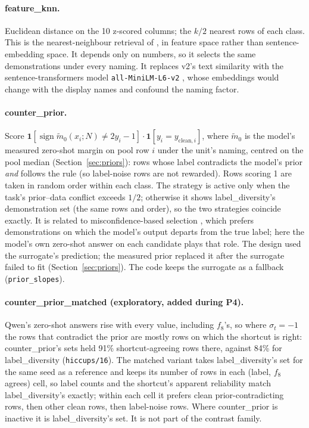 \documentclass[11pt,a4paper]{article}
\newcommand{\1}{\mathbf{1}}
\DeclareMathOperator{\sign}{sign}
\theoremstyle{plain}
\theoremstyle{definition}
\theoremstyle{remark}
\begin{document}
\paragraph{feature\_knn.} Euclidean distance on the 10 z-scored columns; the
$k/2$ nearest rows of each class. This is the nearest-neighbour retrieval of
\citet{liu2022what}, in feature space rather than sentence-embedding space. It depends only on numbers, so it selects
the same demonstrations under every naming. It replaces v2's text similarity
with the sentence-transformers model \texttt{all-MiniLM-L6-v2}
\citep{reimers2019sentence,wang2020minilm}, whose embeddings would change
with the display names and confound the naming factor.

\paragraph{counter\_prior.} Score
$\1[\sign \tilde m_0(x_i; N) \neq 2y_i - 1]\cdot\1[y_i = y_{\mathrm{clean},i}]$,
where $\tilde m_0$ is the model's measured zero-shot margin on pool row $i$
under the unit's naming, centred on the pool median
(Section~\ref{sec:priors}): rows whose label contradicts the model's prior
\emph{and} follows the rule (so label-noise rows are not rewarded). Rows
scoring 1 are taken in random order within each class. The strategy is
active only when the task's prior--data conflict exceeds $1/2$; otherwise it
shows label\_diversity's demonstration set (the same rows and order), so the
two strategies coincide exactly. It is related to misconfidence-based
selection \citep{xu2024misconfidence}, which prefers demonstrations on which
the model's output departs from the true label; here the model's own
zero-shot answer on each candidate plays that role. The design used the
surrogate's prediction; the measured prior replaced it after the surrogate
failed to fit (Section~\ref{sec:priors}). The code keeps the surrogate as a
fallback (\texttt{prior\_slopes}).

\paragraph{counter\_prior\_matched (exploratory, added during P4).} Qwen's
zero-shot answers rise with every value, including $f_8$'s, so where
$\sigma_t = -1$ the rows that contradict the prior are mostly rows on which
the shortcut is right: counter\_prior's sets held 91\% shortcut-agreeing rows
there, against 84\% for label\_diversity (\texttt{hiccups/16}). The matched
variant takes label\_diversity's set for the same seed as a reference and
keeps its number of rows in each (label, $f_8$ agrees) cell, so label counts
and the shortcut's apparent reliability match label\_diversity's exactly;
within each cell it prefers clean prior-contradicting rows, then other clean
rows, then label-noise rows. Where counter\_prior is inactive it is
label\_diversity's set. It is not part of the contrast family.
\end{document}
